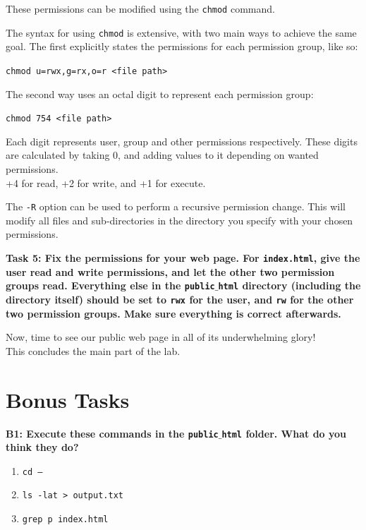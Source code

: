 \documentclass[a4paper,11pt,parskip=half-]{scrartcl}
\begin{document}
These permissions can be modified using the \texttt{chmod} command.

The syntax for using \texttt{chmod} is extensive, with two main ways to achieve the same goal. 
The first explicitly states the permissions for each permission group, like so:

\qquad \texttt{chmod u=rwx,g=rx,o=r <file path>}

The second way uses an octal digit to represent each permission group:

\qquad \texttt{chmod 754 <file path>} 

Each digit represents user, group and other permissions respectively. 
These digits are calculated by taking 0, and adding values to it depending on wanted permissions. \\
+4 for read, +2 for write, and +1 for execute.

The \texttt{-R} option can be used to perform a recursive permission change. 
This will modify all files and sub-directories in the directory you specify with your chosen permissions.

\bfseries Task 5: \normalfont 
Fix the permissions for your web page. 
For \texttt{index.html}, give the user read and write permissions, and let the other two permission groups read. 
Everything else in the \texttt{public$\_$html} directory (including the directory itself) should be set to \texttt{rwx} for the user, and \texttt{rw} for the other two permission groups. 
Make sure everything is correct afterwards.

Now, time to see our public web page in all of its underwhelming glory! \\ 
This concludes the main part of the lab.

\section*{Bonus Tasks}

\bfseries B1: \normalfont 
Execute these commands in the \texttt{public$\_$html} folder. 
What do you think they do?

\begin{enumerate}
    \item \large \texttt{cd --} \normalsize
    \item \large \texttt{ls -lat > output.txt} \normalsize
    \item \large \texttt{grep p index.html} \normalsize
\end{enumerate}
\end{document}
